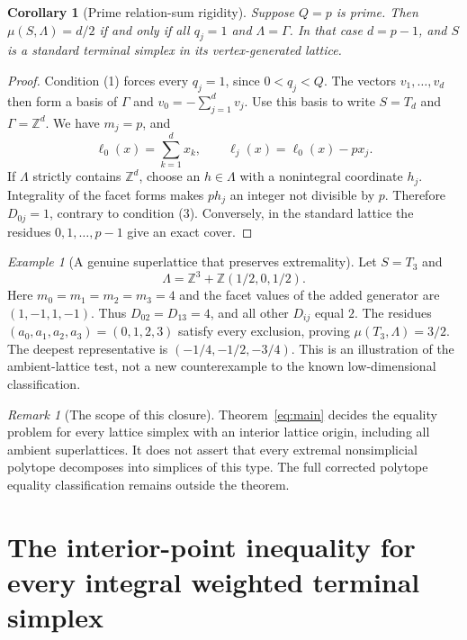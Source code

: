 \documentclass[11pt,a4paper]{article}
\newtheorem{corollary}[theorem]{Corollary}
\theoremstyle{remark}\newtheorem{remark}[theorem]{Remark}
\newtheorem{example}[theorem]{Example}
\begin{document}
\begin{corollary}[Prime relation-sum rigidity]\label{eq:prime}
Suppose $Q=p$ is prime. Then $\mu(S,\Lambda)=d/2$ if and only if
all $q_j=1$ and $\Lambda=\Gamma$. In that case $d=p-1$, and
$S$ is a standard terminal simplex in its vertex-generated lattice.
\end{corollary}
\begin{proof}
Condition (1) forces every $q_j=1$, since $0<q_j<Q$. The vectors
$v_1,\ldots,v_d$ then form a basis of $\Gamma$ and
$v_0=-\sum_{j=1}^d v_j$. Use this basis to write $S=T_d$ and
$\Gamma=\mathbb Z^d$. We have $m_j=p$, and
\[
 \ell_0(x)=\sum_{k=1}^{d}x_k,
 \qquad \ell_j(x)=\ell_0(x)-p x_j.
\]
If $\Lambda$ strictly contains $\mathbb Z^d$, choose an $h\in\Lambda$
with a nonintegral coordinate $h_j$. Integrality of the facet
forms makes $p h_j$ an integer not divisible by $p$. Therefore
$D_{0j}=1$, contrary to condition (3). Conversely, in the standard
lattice the residues $0,1,\ldots,p-1$ give an exact cover.
\end{proof}

\begin{example}[A genuine superlattice that preserves extremality]
Let $S=T_3$ and
\[
 \Lambda=\mathbb Z^3+
          \mathbb Z(1/2,0,1/2).
\]
Here $m_0=m_1=m_2=m_3=4$ and the facet values of the added
generator are $(1,-1,1,-1)$. Thus $D_{02}=D_{13}=4$, and all
other $D_{ij}$ equal $2$. The residues $(a_0,a_1,a_2,a_3)=(0,1,2,3)$
satisfy every exclusion, proving $\mu(T_3,\Lambda)=3/2$.
The deepest representative is $(-1/4,-1/2,-3/4)$.
This is an illustration of the ambient-lattice test, not a new
counterexample to the known low-dimensional classification.
\end{example}

\begin{remark}[The scope of this closure]
Theorem~\ref{eq:main} decides the equality problem for every lattice
simplex with an interior lattice origin, including all ambient
superlattices. It does not assert that every extremal nonsimplicial
polytope decomposes into simplices of this type. The full corrected
polytope equality classification remains outside the theorem.
\end{remark}


\section{The interior-point inequality for every integral weighted terminal simplex}
\label{r4d:integral-terminal}
\end{document}
